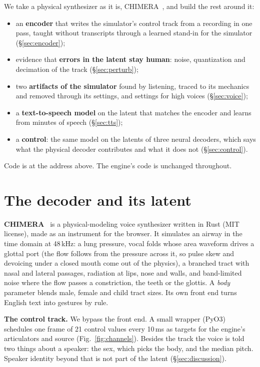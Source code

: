 \documentclass[10pt,a4paper,twocolumn]{article}
\begin{document}
We take a physical synthesizer as it is, CHIMERA~\cite{chimera}, and build the rest around it:
\begin{itemize}
\item an \textbf{encoder} that writes the simulator's control track from a recording in one pass,
taught without transcripts through a learned stand-in for the simulator (\S\ref{sec:encoder});
\item evidence that \textbf{errors in the latent stay human}: noise, quantization and decimation
of the track (\S\ref{sec:perturb});
\item two \textbf{artifacts of the simulator} found by listening, traced to its mechanics and
removed through its settings, and settings for high voices (\S\ref{sec:voice});
\item a \textbf{text-to-speech model} on the latent that matches the encoder and learns from
minutes of speech (\S\ref{sec:tts});
\item a \textbf{control}: the same model on the latents of three neural decoders, which says
what the physical decoder contributes and what it does not (\S\ref{sec:control}).
\end{itemize}
Code is at the address above. The engine's code is unchanged throughout.

\section{The decoder and its latent}\label{sec:decoder}
\textbf{CHIMERA}~\cite{chimera} is a physical-modeling voice synthesizer written in Rust (MIT
license), made as an instrument for the browser. It simulates an airway in the time domain at
48\,kHz: a lung pressure, vocal folds whose area waveform drives a glottal port (the flow follows
from the pressure across it, so pulse skew and devoicing under a closed mouth come out of the
physics), a branched tract with nasal and lateral passages, radiation at lips, nose and walls,
and band-limited noise where the flow passes a constriction, the teeth or the glottis. A
\emph{body} parameter blends male, female and child tract sizes. Its own front end turns English
text into gestures by rule.

\textbf{The control track.} We bypass the front end. A small wrapper (PyO3) schedules one
frame of 21 control values every 10\,ms as targets for the engine's articulators and source
(Fig.~\ref{fig:channels}).
Besides the track the voice is told two things about a speaker: the sex, which picks the body,
and the median pitch. Speaker identity beyond that is not part of the latent
(\S\ref{sec:discussion}).
\end{document}
